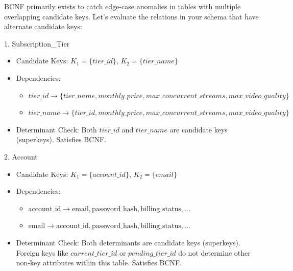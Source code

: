 BCNF primarily exists to catch edge-case anomalies in tables with multiple overlapping candidate keys. Let's evaluate the relations in your schema that have alternate candidate keys:

1. Subscription\_\allowbreak{}Tier

\begin{itemize}
\item
  Candidate Keys: \(K_{1} = \{ tier\_\allowbreak{} id\}\), \(K_{2} = \{ tier\_\allowbreak{} name\}\)
\item
  Dependencies:

  \begin{itemize}
  \item
    \(tier\_\allowbreak{} id \rightarrow \{ tier\_\allowbreak{} name,monthly\_\allowbreak{} price,max\_\allowbreak{} concurrent\_\allowbreak{} streams,max\_\allowbreak{} video\_\allowbreak{} quality\}\)
  \item
    \(tier\_\allowbreak{} name \rightarrow \{ tier\_\allowbreak{} id,monthly\_\allowbreak{} price,max\_\allowbreak{} concurrent\_\allowbreak{} streams,max\_\allowbreak{} video\_\allowbreak{} quality\}\)
  \end{itemize}
\item
  Determinant Check: Both \(tier\_\allowbreak{} id\) and \(tier\_\allowbreak{} name\) are candidate keys (superkeys). Satisfies BCNF.
\end{itemize}

2. Account

\begin{itemize}
\item
  Candidate Keys: \(K_{1} = \{ account\_\allowbreak{} id\}\), \(K_{2} = \{ email\}\)
\item
  Dependencies:

  \begin{itemize}
  \item
    \(\text{account\_id} \to {\text{email},\allowbreak  \text{password\_hash},\allowbreak  \text{billing\_status},\allowbreak  \dots}\)
  \item
    \(\text{email} \to {\text{account\_id},\allowbreak  \text{password\_hash},\allowbreak  \text{billing\_status},\allowbreak  \dots}\)
  \end{itemize}
\item
  Determinant Check: Both determinants are candidate keys (superkeys). Foreign keys like \(current\_\allowbreak{} tier\_\allowbreak{} id\) or \(pending\_\allowbreak{} tier\_\allowbreak{} id\) do not determine other non-key attributes within this table. Satisfies BCNF.
\end{itemize}

